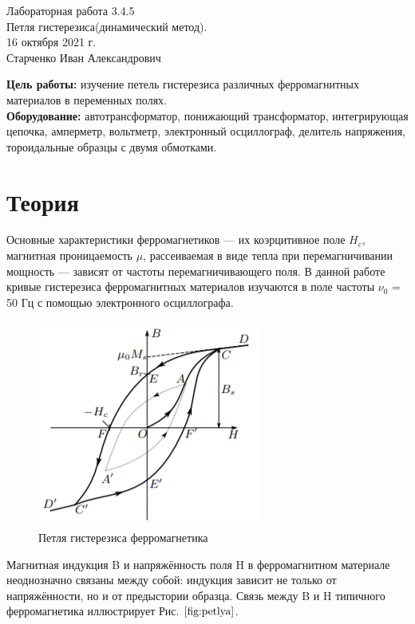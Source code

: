 


\setcounter{page}{1}

\begin{center}
  \LARGE{Лабораторная работа 3.4.5}\\[0.2cm]
  \LARGE{Петля гистерезиса(динамический метод).}\\[0.2cm]
  \large{16 октября 2021 г.}\\[0.2cm]
  \large{Старченко Иван Александрович}\\[0.2cm]
\end{center}

\textbf{Цель работы:} изучение петель гистерезиса различных ферромагнитных
материалов в переменных полях.
\\

\textbf{Оборудование:} автотрансформатор, понижающий трансформатор, интегрирующая цепочка, амперметр, вольтметр, электронный
осциллограф, делитель напряжения, тороидальные образцы с двумя обмотками.

\section{Теория}
Основные характеристики
ферромагнетиков — их коэрцитивное поле $H_c$, магнитная проницаемость
$\mu$, рассеиваемая в виде тепла при перемагничивании мощность — зависят
от частоты перемагничивающего поля. В данной работе кривые гистерезиса ферромагнитных материалов изучаются в поле частоты $\nu_0$ = 50 Гц
с помощью электронного осциллографа.
\begin{figure}[h!]
    \centering
    \includegraphics{petlya.png}
    \caption{Петля гистерезиса ферромагнетика}
    \label{fig:petlya}
\end{figure}

Магнитная индукция B и напряжённость поля H в ферромагнитном материале неоднозначно связаны между собой: индукция зависит
не только от напряжённости, но и от предыстории образца. Связь между B и H типичного ферромагнетика иллюстрирует Рис. $\ref{fig:petlya}$.


